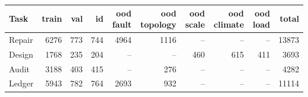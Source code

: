 \begingroup\small\setlength{\tabcolsep}{4pt}
\begin{tabular}{@{}lrrrrrrrrr@{}}
\toprule
Task & train & val & id & ood fault & ood topology & ood scale & ood climate & ood load & total \\
\midrule
Repair & 6276 & 773 & 744 & 4964 & 1116 & -- & -- & -- & 13873 \\
Design & 1768 & 235 & 204 & -- & -- & 460 & 615 & 411 & 3693 \\
Audit & 3188 & 403 & 415 & -- & 276 & -- & -- & -- & 4282 \\
Ledger & 5943 & 782 & 764 & 2693 & 932 & -- & -- & -- & 11114 \\
\bottomrule
\end{tabular}\endgroup
